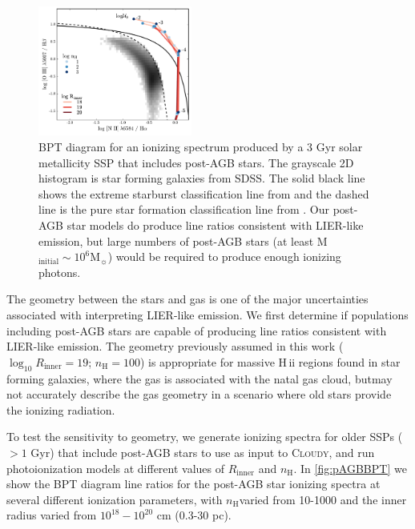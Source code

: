 \documentclass[twocolumn, tighten]{aastex61}
\newcommand{\Fig}[1]{\autoref{fig:#1}}
\newcommand{\Cloudy}{\textsc{Cloudy}\xspace}
\newcommand{\logten}{\ensuremath{\log_{10}}}
\newcommand\Msun{\ensuremath{\mathrm{M_{\sun}}}}
\newcommand{\hii}{H\,{\sc ii}\xspace}
\newcommand{\nH}{\ensuremath{n_{\mathrm{H}}}}
\newcommand{\Rin}{\ensuremath{R_{\mathrm{inner}}}}
\newcommand{\logR}{\ensuremath{\logten R_{\mathrm{inner}}}}
\begin{document}
\begin{figure} [ht]
  \begin{centering}
    \includegraphics[width=0.45\textwidth]{f25.pdf}
    \caption{BPT diagram for an ionizing spectrum produced by a 3 Gyr solar metallicity SSP that includes post-AGB stars. The grayscale 2D histogram is star forming galaxies from SDSS. The solid black line shows the extreme starburst classification line from \citet{Kewley01} and the dashed line is the pure star formation classification line from \citet{Kauffmann03a}. Our post-AGB star models do produce line ratios consistent with LIER-like emission, but large numbers of post-AGB stars (at least M$_{\mathrm{initial}} \sim 10^6\Msun{}$) would be required to produce enough ionizing photons.}
    \label{fig:pAGBBPT}
  \end{centering}
\end{figure}

The geometry between the stars and gas is one of the major uncertainties associated with interpreting LIER-like emission. We first determine if populations including post-AGB stars are capable of producing line ratios consistent with LIER-like emission. The geometry previously assumed in this work ($\logR = 19$; $\nH = 100$) is appropriate for massive \hii regions found in star forming galaxies, where the gas is associated with the natal gas cloud, butmay not accurately describe the gas geometry in a scenario where old stars provide the ionizing radiation.

To test the sensitivity to geometry, we generate ionizing spectra for older SSPs ($>1$ Gyr) that include post-AGB stars to use as input to \Cloudy, and run photoionization models at different values of \Rin{} and \nH{}. In \Fig{pAGBBPT} we show the BPT diagram line ratios for the post-AGB star ionizing spectra at several different ionization parameters, with \nH varied from 10-1000 and the inner radius varied from $10^{18}-10^{20}$ cm (0.3-30 pc). 
\end{document}
